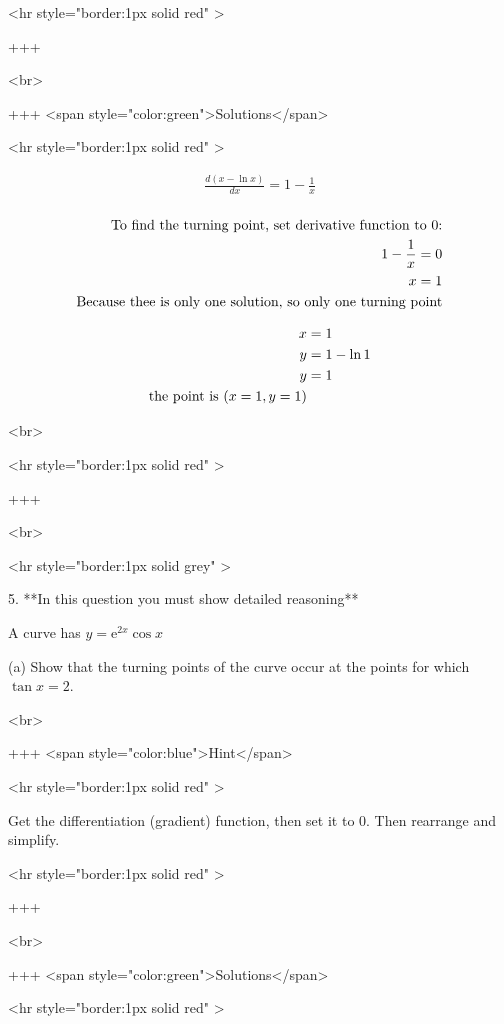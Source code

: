 <hr style="border:1px solid red" >

+++

<br>

+++ <span style="color:green">Solutions</span>

<hr style="border:1px solid red" >

$$
\begin{aligned}
\frac{d(x-\ln x)}{d x}=1-\frac{1}{x}\\
\end{aligned}
$$

$$
\begin{aligned}
\newline
\text{To find the turning point, set derivative function to 0:}\\
1-\frac{1}{x}=0\\
x=1 \\
\text{Because thee is only one solution, so only one turning point}
\end{aligned}
$$

$$
\begin{aligned}
x&=1\\
y&=1-\ln 1\\
y&=1\\
\text{the point is ${(x=1, \space y=1)}$}
\end{aligned}
$$

<br>

<hr style="border:1px solid red" >

+++

<br>

<hr style="border:1px solid grey" >

5. **In this question you must show detailed reasoning**

A curve has $y=\mathrm{e}^{2 x} \cos x$

(a) Show that the turning points of the curve occur at the points for which $\tan x=2$.

<br>

+++ <span style="color:blue">Hint</span>

<hr style="border:1px solid red" >

Get the differentiation (gradient) function, then set it to 0. Then rearrange and simplify.

<hr style="border:1px solid red" >

+++

<br>

+++ <span style="color:green">Solutions</span>

<hr style="border:1px solid red" >


